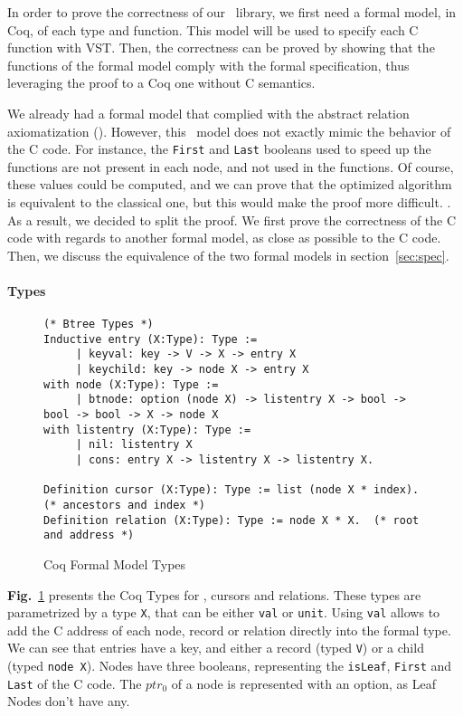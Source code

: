 In order to prove the correctness of our \btrees\ library, we first need a formal model, in Coq, of each type and function.
This model will be used to specify each C function with VST.
Then, the correctness can be proved by showing that the functions of the formal model comply with the formal specification, thus leveraging the proof to a Coq one without C semantics.

We already had a formal model that complied with the abstract relation axiomatization ().
However, this \btree\ model does not exactly mimic the behavior of the C code.
For instance, the \texttt{First} and \texttt{Last} booleans used to speed up the functions are not present in each node, and not used in the functions.
Of course, these values could be computed, and we can prove that the optimized algorithm is equivalent to the classical one, but this would make the proof more difficult. .
As a result, we decided to split the proof. We first prove the correctness of the C code with regards to another formal model, as close as possible to the C code.
Then, we discuss the equivalence of the two formal models in section~\ref{sec:spec}.

\paragraph{Types}
\begin{figure}
\begin{lstlisting}
(* Btree Types *)
Inductive entry (X:Type): Type :=
     | keyval: key -> V -> X -> entry X
     | keychild: key -> node X -> entry X
with node (X:Type): Type :=
     | btnode: option (node X) -> listentry X -> bool -> bool -> bool -> X -> node X
with listentry (X:Type): Type :=
     | nil: listentry X
     | cons: entry X -> listentry X -> listentry X.

Definition cursor (X:Type): Type := list (node X * index). (* ancestors and index *)
Definition relation (X:Type): Type := node X * X.  (* root and address *)
\end{lstlisting}
\label{fig:coqtypes}
\caption{Coq Formal Model Types}
\end{figure}

\textbf{Fig.}~\ref{fig:coqtypes} presents the Coq Types for \btrees, cursors and relations.
These types are parametrized by a type \texttt{X}, that can be either \texttt{val} or \texttt{unit}.
Using \texttt{val} allows to add the C address of each node, record or relation directly into the formal type.
We can see that entries have a key, and either a record (typed \texttt{V}) or a child (typed \texttt{node X}).
Nodes have three booleans, representing the \texttt{isLeaf}, \texttt{First} and \texttt{Last} of the C code.
The $ptr_0$ of a node is represented with an option, as Leaf Nodes don't have any.

